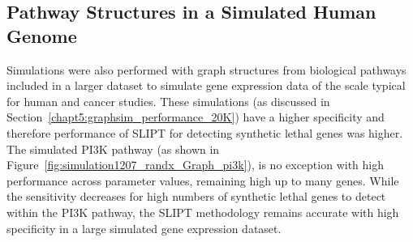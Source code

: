 \FloatBarrier

\subsection{Pathway Structures in a Simulated Human Genome}

\FloatBarrier

Simulations were also performed with \gls{graph} structures from biological pathways included in a larger dataset to simulate \gls{gene expression} data of the scale typical for human and cancer studies. These simulations (as discussed in Section~\ref{chapt5:graphsim_performance_20K}) have a higher specificity and therefore performance of \gls{SLIPT} for detecting \gls{synthetic lethal} genes was higher. The simulated \gls{PI3K} pathway (as shown in Figure~\ref{fig:simulation1207_randx_Graph_pi3k}), is no exception with high performance across parameter values, remaining high up to many genes. While the sensitivity decreases for high numbers of \gls{synthetic lethal} genes to detect within the \gls{PI3K} pathway, the \gls{SLIPT} methodology remains accurate with high specificity in a large simulated \gls{gene expression} dataset. 

